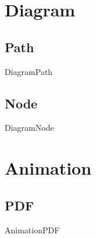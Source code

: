 \documentclass[10pt]{beamer}
\begin{document}
\section{Diagram}
\subsection{Path}
\begin{frame}{Diagram}{Path}
\end{frame}

\subsection{Node}
\begin{frame}{Diagram}{Node}
\end{frame}


\section{Animation}
\subsection{PDF}
\begin{frame}{Animation}{PDF}
\end{frame}

\end{document}
